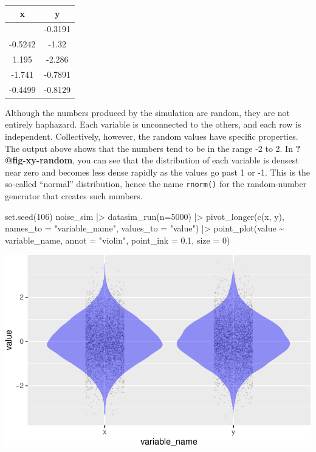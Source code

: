 \documentclass[
  letterpaper,
  DIV=11,
  numbers=noendperiod,
  oneside]{scrartcl}
\newenvironment{Shaded}{\begin{snugshade}}{\end{snugshade}}
\newcommand{\AttributeTok}[1]{\textcolor[rgb]{0.40,0.45,0.13}{#1}}
\newcommand{\DecValTok}[1]{\textcolor[rgb]{0.68,0.00,0.00}{#1}}
\newcommand{\FloatTok}[1]{\textcolor[rgb]{0.68,0.00,0.00}{#1}}
\newcommand{\FunctionTok}[1]{\textcolor[rgb]{0.28,0.35,0.67}{#1}}
\newcommand{\NormalTok}[1]{\textcolor[rgb]{0.00,0.23,0.31}{#1}}
\newcommand{\SpecialCharTok}[1]{\textcolor[rgb]{0.37,0.37,0.37}{#1}}
\newcommand{\StringTok}[1]{\textcolor[rgb]{0.13,0.47,0.30}{#1}}
\begin{document}
\begin{longtable}[]{@{}cc@{}}
\toprule\noalign{}
x & y \\
\midrule\noalign{}
\endhead
\bottomrule\noalign{}
\endlastfoot
2.819 & -0.3191 \\
-0.5242 & -1.32 \\
1.195 & -2.286 \\
-1.741 & -0.7891 \\
-0.4499 & -0.8129 \\
\end{longtable}

Although the numbers produced by the simulation are random, they are not
entirely haphazard. Each variable is unconnected to the others, and each
row is independent. Collectively, however, the random values have
specific properties. The output above shows that the numbers tend to be
in the range -2 to 2. In \textbf{?@fig-xy-random}, you can see that the
distribution of each variable is densest near zero and becomes less
dense rapidly as the values go past 1 or -1. This is the so-called
``normal'' distribution, hence the name \texttt{rnorm()} for the
random-number generator that creates such numbers.

\begin{Shaded}
\begin{Highlighting}[]
\FunctionTok{set.seed}\NormalTok{(}\DecValTok{106}\NormalTok{)}
\NormalTok{noise\_sim }\SpecialCharTok{|\textgreater{}} \FunctionTok{datasim\_run}\NormalTok{(}\AttributeTok{n=}\DecValTok{5000}\NormalTok{) }\SpecialCharTok{|\textgreater{}}
  \FunctionTok{pivot\_longer}\NormalTok{(}\FunctionTok{c}\NormalTok{(x, y), }
               \AttributeTok{names\_to =} \StringTok{"variable\_name"}\NormalTok{, }\AttributeTok{values\_to =} \StringTok{"value"}\NormalTok{) }\SpecialCharTok{|\textgreater{}}
  \FunctionTok{point\_plot}\NormalTok{(value }\SpecialCharTok{\textasciitilde{}}\NormalTok{ variable\_name, }\AttributeTok{annot =} \StringTok{"violin"}\NormalTok{, }
             \AttributeTok{point\_ink =} \FloatTok{0.1}\NormalTok{, }\AttributeTok{size =} \DecValTok{0}\NormalTok{)}
\end{Highlighting}
\end{Shaded}

\includegraphics{test-tufte_files/figure-pdf/unnamed-chunk-166-1.pdf}
\end{document}
